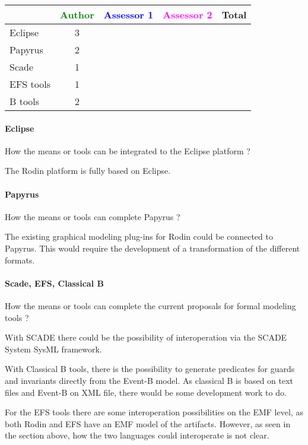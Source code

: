 \begin{tabular}{|l | c | c | c | c|}
\hline
& \textcolor{green}{Author} & \textcolor{blue}{Assessor 1} & \textcolor{magenta}{Assessor 2} & Total \\
\hline
Eclipse & 3 & & &  \\
\hline
Papyrus  & 2 & & & \\
\hline
Scade & 1 & & & \\
\hline
EFS tools & 1 & & & \\
\hline
B tools & 2 & & & \\
\hline
\end{tabular}


\paragraph{Eclipse}
How the means or tools can be integrated to the Eclipse platform ?

\begin{author_comment}
  The Rodin platform is fully based on Eclipse.
\end{author_comment}

\paragraph{Papyrus}
How the means or tools can complete  Papyrus ?

\begin{author_comment}
  The existing graphical modeling plug-ins for Rodin could be connected to
  Papyrus. This would require the development of a transformation of the
  different formats.
\end{author_comment}


\paragraph{Scade, EFS, Classical B}
How the means or tools can complete the current proposals for formal modeling tools ?

\begin{author_comment}
  With SCADE there could be the possibility of interoperation via the SCADE
  System SysML framework.

  With Classical B tools, there is the possibility to generate predicates for
  guards and invariants directly from the Event-B model. As classical B is based
  on text files and Event-B on XML file, there would be some development work to
  do.

  For the EFS tools there are some interoperation possibilities on the EMF
  level, as both Rodin and EFS have an EMF model of the artifacts. However, as
  seen in the section above, how the two languages could interoperate is not
  clear.
\end{author_comment}

